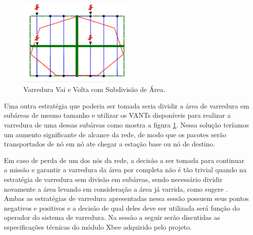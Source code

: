 \begin{figure} 
\center
\includegraphics[width=0.5\textwidth]{comsubdivisao.png}
\caption{Varredura Vai e Volta com Subdivisão de Área.} 
\label{fig:comsubdivisao}
\end{figure}

Uma outra estratégia que poderia ser tomada seria dividir a área de varredura em subáreas de mesmo tamanho e utilizar os VANTs disponíveis para realizar a varredura de uma dessas subáreas como mostra a figura \ref{fig:comsubdivisao}. Nessa solução teríamos um aumento significante de alcance da rede, de modo que os pacotes serão transportados de nó em nó ate chegar a estação base ou nó de destino.

Em caso de perda de um dos nós da rede, a decisão a ser tomada para continuar a missão e garantir a varredura da área por completa não é tão trivial quando na estratégia de varredura sem divisão em subáreas, sendo necessário dividir novamente a área levando em consideração a área já varrida, como sugere \cite{marro2013path}.\\

Ambas as estratégias de varredura apresentadas nessa sessão possuem seus pontos negativos e positivos e a decisão de qual deles deve ser utilizada será função do operador do sistema de varredura. Na sessão a seguir serão discutidas as especificações técnicas do módulo Xbee adquirido pelo projeto.





